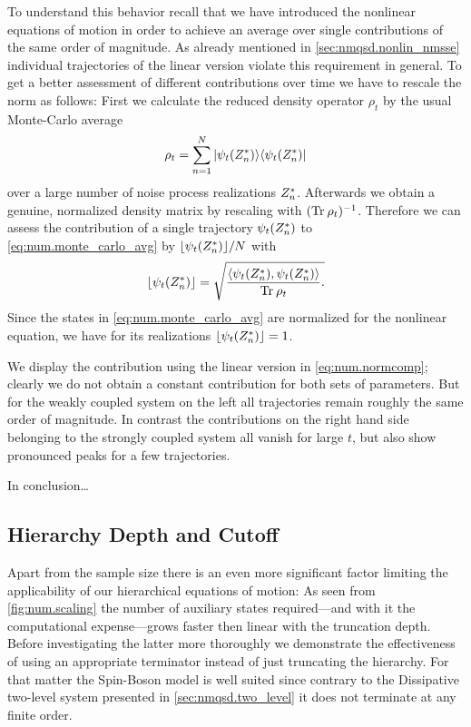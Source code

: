 To understand this behavior recall that we have introduced the nonlinear equations of motion in order to achieve an average over single contributions of the same order of magnitude.
As already mentioned in \autoref{sec:nmqsd.nonlin_nmsse} individual trajectories of the linear version violate this requirement in general.
To get a better assessment of different contributions over time we have to rescale the norm as follows:
First we calculate the reduced density operator $\rho_t$ by the usual Monte-Carlo average
\begin{equation}
  \rho_t = \sum_{n=1}^N | \psi_t({Z}^*_n) \rangle \langle \psi_t({Z}^*_n) |
  \label{eq:num.monte_carlo_avg}
\end{equation}
over a large number of noise process realizations ${Z}^*_n$.
Afterwards we obtain a genuine, normalized density matrix by rescaling with $(\operatorname{Tr}_\mathrm{} \rho_t)^{-1}$.
Therefore we can assess the contribution of a single trajectory $\psi_t({Z}^*_n)$ to \autoref{eq:num.monte_carlo_avg} by $\lfloor \psi_t({Z}^*_n) \rfloor / N$ with
\begin{equation}
  \lfloor \psi_t(\ZZ_n) \rfloor = \sqrt{%
    \frac{\sp{\psi_t(\ZZ_n)}{\psi_t(\ZZ_n)}}{\Tr{} \rho_t}.
  }
  \label{eq:num.contribution}
\end{equation}
Since the states in \autoref{eq:num.monte_carlo_avg} are normalized for the nonlinear equation, we have for its realizations $\lfloor\psi_t({Z}^*_n)\rfloor = 1$.

We display the contribution using the linear version in \autoref{eq:num.normcomp}; clearly we do not obtain a constant contribution for both sets of parameters.
But for the weakly coupled system on the left all trajectories remain roughly the same order of magnitude.
In contrast the contributions on the right hand side belonging to the strongly coupled system all vanish for large $t$, but also show pronounced peaks for a few trajectories.

In conclusion\dots


\subsection{Hierarchy Depth and Cutoff}
\label{sub:num.spin_boson.depth}

Apart from the sample size there is an even more significant factor limiting the applicability of our hierarchical equations of motion:
As seen from \autoref{fig:num.scaling} the number of auxiliary states required---and with it the computational expense---grows faster then linear with the truncation depth.
Before investigating the latter more thoroughly we demonstrate the effectiveness of using an appropriate terminator instead of just truncating the hierarchy.
For that matter the Spin-Boson model is well suited since contrary to the Dissipative two-level system presented in \autoref{sec:nmqsd.two_level} it does not terminate at any finite order.



